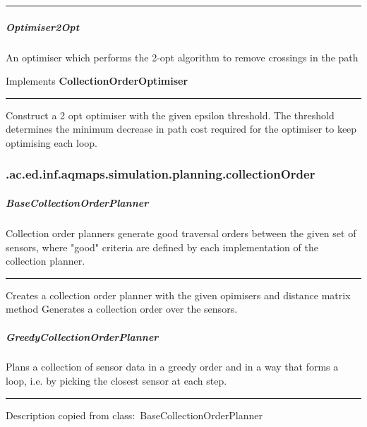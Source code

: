 \hrule
\begin{mitem}
\scriptsize
	{}
\end{mitem}

\subparagraph{ Optimiser2Opt } An optimiser which performs the 2-opt algorithm to remove crossings in the path
 
Implements \textbf{ CollectionOrderOptimiser }
\hrule
\begin{mitem}
\scriptsize
	{Construct a 2 opt optimiser with the given epsilon threshold. The threshold determines the minimum decrease in path cost required for the optimiser to keep optimising each loop.}
	{}
\end{mitem}

\subsubsection{ .ac.ed.inf.aqmaps.simulation.planning.collectionOrder }
\subparagraph{ BaseCollectionOrderPlanner } Collection order planners generate good traversal orders between the given set of sensors,
 where "good" criteria are defined by each implementation of the collection planner.
 
\hrule
\begin{mitem}
\scriptsize
	{Creates a collection order planner with the given opimisers and distance matrix method}
	{Generates a collection order over the sensors.}
\end{mitem}

\subparagraph{ GreedyCollectionOrderPlanner } Plans a collection of sensor data in a greedy order and in a way that forms a loop, 
 i.e. by picking the closest sensor at each step.
 
\hrule
\begin{mitem}
\scriptsize
	{}
	{Description copied from class:~BaseCollectionOrderPlanner}
\end{mitem}

